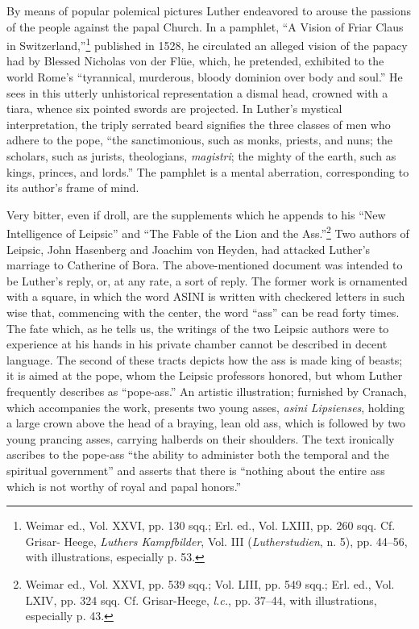 By means of popular polemical pictures Luther endeavored to
arouse the passions of the people against the papal Church. In a pamphlet,
“A Vision of Friar Claus in Switzerland,”\footnote
{Weimar ed., Vol. XXVI, pp. 130 sqq.; Erl. ed., Vol. LXIII, pp. 260 sqq. Cf. Grisar-
Heege, \textit{Luthers Kampfbilder}, Vol. III (\textit{Lutherstudien}, n. 5), pp. 44--56, with illustrations,
especially p. 53.}
published in 1528,
he circulated an alleged vision of the papacy had by Blessed Nicholas
von der Flüe, which, he pretended, exhibited to the world Rome’s
“tyrannical, murderous, bloody dominion over body and soul.” He
sees in this utterly unhistorical representation a dismal head, crowned
with a tiara, whence six pointed swords are projected. In Luther’s
mystical interpretation, the triply serrated beard signifies the three
classes of men who adhere to the pope, “the sanctimonious, such as
monks, priests, and nuns; the scholars, such as jurists, theologians,
\textit{magistri}; the mighty of the earth, such as kings, princes, and lords.”
The pamphlet is a mental aberration, corresponding to its author’s
frame of mind.

Very bitter, even if droll, are the supplements which he appends
to his “New Intelligence of Leipsic” and “The Fable of the Lion and
the Ass.”\footnote
{Weimar ed., Vol. XXVI, pp. 539 sqq.; Vol. LIII, pp. 549 sqq.; Erl. ed., Vol. LXIV, pp.
324 sqq. Cf. Grisar-Heege, \textit{l.c.}, pp. 37--44, with illustrations, especially p. 43.}
Two authors of Leipsic, John Hasenberg and Joachim
von Heyden, had attacked Luther’s marriage to Catherine of Bora.
The above-mentioned document was intended to be Luther’s reply,
or, at any rate, a sort of reply. The former work is ornamented with
a square, in which the word ASINI is written with checkered letters
in such wise that, commencing with the center, the word “ass” can
be read forty times. The fate which, as he tells us, the writings of the
two Leipsic authors were to experience at his hands in his private
chamber cannot be described in decent language. The second of these
tracts depicts how the ass is made king of beasts; it is aimed at the pope,
whom the Leipsic professors honored, but whom Luther frequently
describes as “pope-ass.” An artistic illustration; furnished by Cranach,
which accompanies the work, presents two young asses, \textit{asini Lipsienses},
holding a large crown above the head of a braying, lean old ass, which
is followed by two young prancing asses, carrying halberds on their
shoulders. The text ironically ascribes to the pope-ass “the ability to
administer both the temporal and the spiritual government” and asserts
that there is “nothing about the entire ass which is not worthy
of royal and papal honors.”

